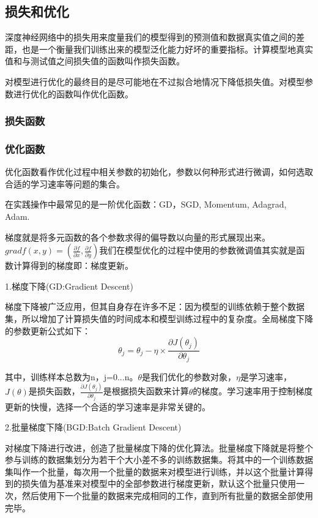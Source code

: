 \documentclass[openbib]{article}
\begin{document}
\subsection{损失和优化}
深度神经网络中的损失用来度量我们的模型得到的预测值和数据真实值之间的差距，也是一个衡量我们训练出来的模型泛化能力好坏的重要指标。计算模型地真实值和与测试值之间损失值的函数叫作损失函数。

对模型进行优化的最终目的是尽可能地在不过拟合地情况下降低损失值。对模型参数进行优化的函数叫作优化函数。

\subsubsection{损失函数}


\subsubsection{优化函数}
优化函数看作优化过程中相关参数的初始化，参数以何种形式进行微调，如何选取合适的学习速率等问题的集合。

在实践操作中最常见的是一阶优化函数：GD，SGD, Momentum, Adagrad, Adam.

梯度就是将多元函数的各个参数求得的偏导数以向量的形式展现出来。$gradf(x,y)=(\frac{\partial f}{\partial x},\frac{\partial f}{\partial y})$我们在模型优化的过程中使用的参数微调值其实就是函数计算得到的梯度即：梯度更新。

\begin{center}
	1.梯度下降(GD:Gradient Descent)
\end{center}

梯度下降被广泛应用，但其自身存在许多不足：因为模型的训练依赖于整个数据集，所以增加了计算损失值的时间成本和模型训练过程中的复杂度。全局梯度下降的参数更新公式如下：
$$\theta_j=\theta_j-\eta\times\frac{\partial J(\theta_j)}{\partial \theta_j}$$

其中，训练样本总数为n，j=0...n。$\theta$是我们优化的参数对象，$\eta$是学习速率，$J(\theta)$是损失函数，$\frac{\partial J(\theta_j)}{\partial \theta_j}$是根据损失函数来计算$\theta$的梯度。学习速率用于控制梯度更新的快慢，选择一个合适的学习速率是非常关键的。

\begin{center}
	2.批量梯度下降(BGD:Batch Gradient Descent)
\end{center}

对梯度下降进行改进，创造了批量梯度下降的优化算法。批量梯度下降就是将整个参与训练的数据集划分为若干个大小差不多的训练数据集。将其中的一个训练数据集叫作一个批量，每次用一个批量的数据来对模型进行训练，并以这个批量计算得到的损失值为基准来对模型中的全部参数进行梯度更新，默认这个批量只使用一次，然后使用下一个批量的数据来完成相同的工作，直到所有批量的数据全部使用完毕。
\end{document}
